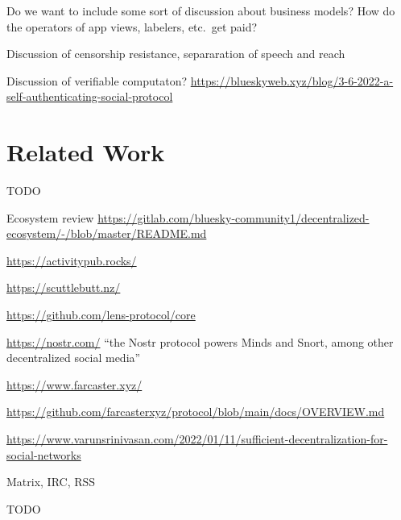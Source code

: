 \documentclass[sigconf,review]{acmart}
\begin{document}
Do we want to include some sort of discussion about business models? How do the operators of app views, labelers, etc.\ get paid?

Discussion of censorship resistance, separaration of speech and reach

Discussion of verifiable computaton? \url{https://blueskyweb.xyz/blog/3-6-2022-a-self-authenticating-social-protocol}

\section{Related Work}\label{sec:related-work}

TODO

Ecosystem review \url{https://gitlab.com/bluesky-community1/decentralized-ecosystem/-/blob/master/README.md}

\url{https://activitypub.rocks/}

\url{https://scuttlebutt.nz/}

\url{https://github.com/lens-protocol/core}

\url{https://nostr.com/}
``the Nostr protocol powers Minds and Snort, among other decentralized social media''

\url{https://www.farcaster.xyz/}

\url{https://github.com/farcasterxyz/protocol/blob/main/docs/OVERVIEW.md}

\url{https://www.varunsrinivasan.com/2022/01/11/sufficient-decentralization-for-social-networks}

Matrix, IRC, RSS


\begin{acks}
TODO
\end{acks}



\end{document}
